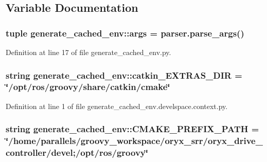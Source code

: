 \subsection{\-Variable \-Documentation}
\subsubsection[{args}]{\setlength{\rightskip}{0pt plus 5cm}tuple {\bf generate\-\_\-cached\-\_\-env\-::args} = parser.\-parse\-\_\-args()}\label{namespacegenerate__cached__env_a75c6158373e6fcee899e1337b8c59ad5}


\-Definition at line 17 of file generate\-\_\-cached\-\_\-env.\-py.

\subsubsection[{catkin\-\_\-\-E\-X\-T\-R\-A\-S\-\_\-\-D\-I\-R}]{\setlength{\rightskip}{0pt plus 5cm}string {\bf generate\-\_\-cached\-\_\-env\-::catkin\-\_\-\-E\-X\-T\-R\-A\-S\-\_\-\-D\-I\-R} = \char`\"{}/opt/ros/groovy/share/catkin/cmake\char`\"{}}\label{namespacegenerate__cached__env_a9c24e1b675ff632367a8b8f71cdccf13}


\-Definition at line 1 of file generate\-\_\-cached\-\_\-env.\-develspace.\-context.\-py.

\subsubsection[{\-C\-M\-A\-K\-E\-\_\-\-P\-R\-E\-F\-I\-X\-\_\-\-P\-A\-T\-H}]{\setlength{\rightskip}{0pt plus 5cm}string {\bf generate\-\_\-cached\-\_\-env\-::\-C\-M\-A\-K\-E\-\_\-\-P\-R\-E\-F\-I\-X\-\_\-\-P\-A\-T\-H} = \char`\"{}/home/parallels/groovy\-\_\-workspace/oryx\-\_\-srr/oryx\-\_\-drive\-\_\-controller/devel;/opt/ros/groovy\char`\"{}}\label{namespacegenerate__cached__env_a5febf1390e491671a2bd270eb18aaec9}


